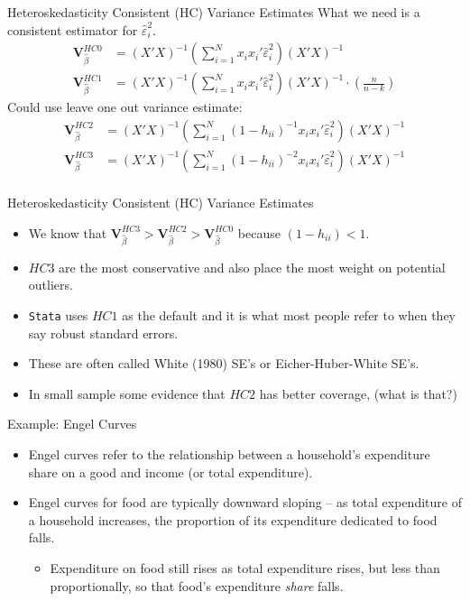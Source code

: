 \begin{frame}{Heteroskedasticity Consistent (HC) Variance Estimates}
What we need is a consistent estimator for $\hat{\varepsilon}^2_i$.
\begin{align*}
\mathbf{V}_{\widehat{\beta}}^{HC0}&= (X'X)^{-1} \left(\sum_{i=1}^N x_i x_i' \hat{\varepsilon}_i^2 \right) (X'X)^{-1} \\
\mathbf{V}_{\widehat{\beta}}^{HC1}&= (X'X)^{-1} \left(\sum_{i=1}^N x_i x_i' \hat{\varepsilon}_i^2 \right) (X'X)^{-1} \cdot \left(\frac{n}{n-k}  \right)
\end{align*}
Could use leave one out variance estimate:
\begin{align*}
\mathbf{V}_{\widehat{\beta}}^{HC2}&= (X'X)^{-1} \left(\sum_{i=1}^N (1-h_{ii})^{-1} x_i x_i' \hat{\varepsilon}_i^2 \right) (X'X)^{-1} \\
\mathbf{V}_{\widehat{\beta}}^{HC3}&= (X'X)^{-1} \left(\sum_{i=1}^N (1-h_{ii})^{-2} x_i x_i' \hat{\varepsilon}_i^2 \right) (X'X)^{-1} \\
\end{align*}
\end{frame}

\begin{frame}{Heteroskedasticity Consistent (HC) Variance Estimates}
\begin{itemize}
\item We know that $\mathbf{V}_{\widehat{\beta}}^{HC3} > \mathbf{V}_{\widehat{\beta}}^{HC2} > \mathbf{V}_{\widehat{\beta}}^{HC0}$ because $(1- h_{ii}) <1$.
\item $HC3$ are the most \alert{conservative} and also place the most weight on potential outliers.
\item \texttt{Stata} uses $HC1$ as the default and it is what most people refer to when they say \alert{robust standard errors}.
\item These are often called White (1980) SE's or Eicher-Huber-White SE's.
\item In small sample some evidence that $HC2$ has better \alert{coverage}, (what is that?)
\end{itemize}
\end{frame}




\begin{frame}{Example: Engel Curves}
\begin{itemize}
	\item Engel curves refer to the relationship between a household's expenditure share on a 
	good and income (or total expenditure).

	\item Engel curves for food are typically downward sloping -- as total expenditure of a household
	increases, the proportion of its expenditure dedicated to food falls.
	\begin{itemize}
		\item Expenditure on food still rises as total expenditure rises, but less than proportionally,
		so that food's expenditure \emph{share} falls.
	\end{itemize}
\end{itemize}
\end{frame}




